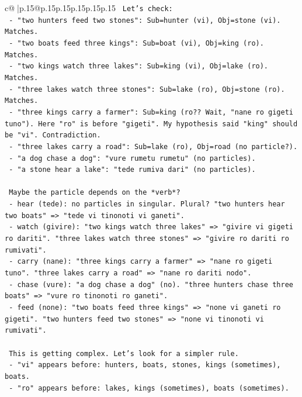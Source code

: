 \documentclass{article}
\begin{document}
{\begin{supertabular}{c@{$\;$}|p{.15\linewidth}@{}p{.15\linewidth}p{.15\linewidth}p{.15\linewidth}p{.15\linewidth}p{.15\linewidth}}
{{{\texttt{    Let's check:} \\
\texttt{    {-} "two hunters feed two stones": Sub=hunter (vi), Obj=stone (vi). Matches.} \\
\texttt{    {-} "two boats feed three kings": Sub=boat (vi), Obj=king (ro). Matches.} \\
\texttt{    {-} "two kings watch three lakes": Sub=king (vi), Obj=lake (ro). Matches.} \\
\texttt{    {-} "three lakes watch three stones": Sub=lake (ro), Obj=stone (ro). Matches.} \\
\texttt{    {-} "three kings carry a farmer": Sub=king (ro?? Wait, "nane ro gigeti tuno"). Here "ro" is before "gigeti". My hypothesis said "king" should be "vi". Contradiction.} \\
\texttt{    {-} "three lakes carry a road": Sub=lake (ro), Obj=road (no particle?).} \\
\texttt{    {-} "a dog chase a dog": "vure rumetu rumetu" (no particles).} \\
\texttt{    {-} "a stone hear a lake": "tede rumiva dari" (no particles).} \\
\\ 
\texttt{    Maybe the particle depends on the *verb*?} \\
\texttt{    {-} hear (tede): no particles in singular. Plural? "two hunters hear two boats" => "tede vi tinonoti vi ganeti".} \\
\texttt{    {-} watch (givire): "two kings watch three lakes" => "givire vi gigeti ro dariti". "three lakes watch three stones" => "givire ro dariti ro rumivati".} \\
\texttt{    {-} carry (nane): "three kings carry a farmer" => "nane ro gigeti tuno". "three lakes carry a road" => "nane ro dariti nodo".} \\
\texttt{    {-} chase (vure): "a dog chase a dog" (no). "three hunters chase three boats" => "vure ro tinonoti ro ganeti".} \\
\texttt{    {-} feed (none): "two boats feed three kings" => "none vi ganeti ro gigeti". "two hunters feed two stones" => "none vi tinonoti vi rumivati".} \\
\\ 
\texttt{    This is getting complex. Let's look for a simpler rule.} \\
\texttt{    {-} "vi" appears before: hunters, boats, stones, kings (sometimes), boats.} \\
\texttt{    {-} "ro" appears before: lakes, kings (sometimes), boats (sometimes).} \\
}}}
\end{supertabular}}
\end{document}
